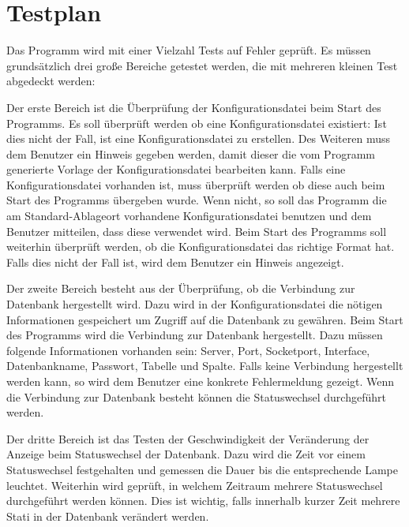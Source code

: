 \documentclass{scrartcl}
\date{}
\begin{document}
\maketitle
\tableofcontents
\renewcommand{\maketitle}{}
\renewcommand{\tableofcontents}{}

\section{Testplan}
Das Programm wird mit einer Vielzahl Tests auf Fehler geprüft. Es müssen grundsätzlich drei große Bereiche getestet werden, die mit mehreren kleinen Test abgedeckt werden:\bigskip

Der erste Bereich ist die Überprüfung der Konfigurationsdatei beim Start des Programms. 
Es soll überprüft werden ob eine Konfigurationsdatei existiert: Ist dies nicht der Fall, ist eine Konfigurationsdatei zu erstellen. Des Weiteren muss dem Benutzer ein Hinweis gegeben werden, damit dieser die vom Programm generierte Vorlage der Konfigurationsdatei bearbeiten kann. 
Falls eine Konfigurationsdatei vorhanden ist, muss überprüft werden ob diese auch beim Start des Programms übergeben wurde. Wenn nicht, so soll das Programm die am Standard-Ablageort vorhandene Konfigurationsdatei benutzen und dem Benutzer mitteilen, dass diese verwendet wird. Beim Start des Programms soll weiterhin überprüft werden, ob die Konfigurationsdatei das richtige Format hat. Falls dies nicht der Fall ist, wird dem Benutzer ein Hinweis angezeigt.

Der zweite Bereich besteht aus der Überprüfung, ob die Verbindung zur Datenbank hergestellt wird. 
Dazu wird in der Konfigurationsdatei die nötigen Informationen gespeichert um Zugriff auf die Datenbank zu gewähren. Beim Start des Programms wird die Verbindung zur Datenbank hergestellt. Dazu müssen folgende Informationen vorhanden sein: Server, Port, Socketport, Interface, Datenbankname, Passwort, Tabelle und Spalte. Falls keine Verbindung hergestellt werden kann, so wird dem Benutzer eine konkrete Fehlermeldung gezeigt. 
Wenn die Verbindung zur Datenbank besteht können die Statuswechsel durchgeführt werden.

Der dritte Bereich ist das Testen der Geschwindigkeit der Veränderung der Anzeige beim Statuswechsel der Datenbank. 
Dazu wird die Zeit vor einem Statuswechsel festgehalten und gemessen die Dauer bis die entsprechende Lampe leuchtet. 
Weiterhin wird geprüft, in welchem Zeitraum mehrere Statuswechsel durchgeführt werden können. Dies ist wichtig, falls innerhalb kurzer Zeit mehrere Stati in der Datenbank verändert werden.\bigskip
\end{document}
